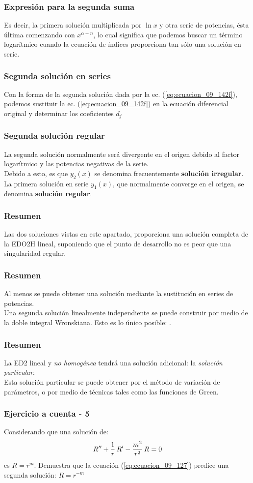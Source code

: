 \documentclass[12pt]{beamer}
\begin{document}
\begin{frame}
\frametitle{Expresión para la segunda suma}
Es decir, la primera solución multiplicada por $\ln x$ y otra serie de potencias, ésta última comenzando con $x^{\alpha - n}$, lo cual significa que podemos buscar un término logarítmico cuando la ecuación de índices proporciona tan sólo una solución en serie.
\end{frame}
\begin{frame}
\frametitle{Segunda solución en series}
Con la forma de la segunda solución dada por la ec. (\ref{eq:ecuacion_09_142f}), podemos sustituir la ec. (\ref{eq:ecuacion_09_142f}) en la ecuación diferencial original y determinar los coeficientes $d_{j}$
\end{frame}
\begin{frame}
\frametitle{Segunda solución regular}
La segunda solución normalmente será divergente en el origen debido al factor logarítmico y las potencias negativas de la serie. 
\\
\bigskip
\pause
Debido a esto, es que $y_{2} (x)$ se denomina frecuentemente \textbf{solución irregular}. La primera solución en serie $y_{1} (x)$, que normalmente converge en el origen, se denomina \textbf{solución regular}.
\end{frame}
\begin{frame}
\frametitle{Resumen}
Las dos soluciones vistas en este apartado, proporciona una solución completa de la EDO2H lineal, suponiendo que el punto de desarrollo no es peor que una singularidad regular. 
\end{frame}
\begin{frame}
\frametitle{Resumen}
Al menos se puede obtener una solución mediante la sustitución en series de potencias.
\\
\bigskip
\pause
Una segunda solución linealmente independiente se puede construir por medio de la doble integral Wronskiana. Esto es lo único posible: .
\end{frame}
\begin{frame}
\frametitle{Resumen}
La ED2 lineal y \textit{no homogénea} tendrá una solución adicional: la \emph{solución particular}.
\\
\bigskip
\pause
Esta solución particular se puede obtener por el método de variación de parámetros, o por medio de técnicas tales como las funciones de Green.
\end{frame}

\begin{frame}
\frametitle{Ejercicio a cuenta - 5}
Considerando que una solución de:
\begin{align*}
{R}^{\prime \prime} + \dfrac{1}{r} \, {R}^{\prime} - \dfrac{m^{2}}{r^{2}} \, R = 0
\end{align*}
es $R = r^{m}$. Demuestra que la ecuación (\ref{eq:ecuacion_09_127}) predice una segunda solución: $R = r^{-m}$
\end{frame}
\end{document}
